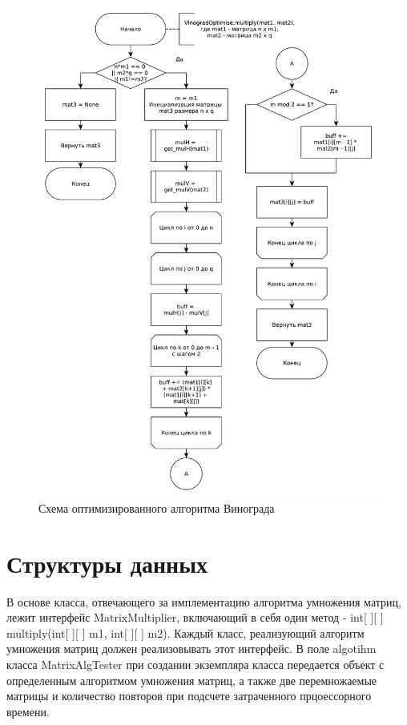 \documentclass[12pt]{report}
\begin{document}
    \begin{figure}[H]
        \centering
        \includegraphics[width=0.85\linewidth]{img/VinogradOptimise}
        \caption{
                Схема оптимизированного алгоритма Винограда
            }
        \label{fig:opt_vinograd}
    \end{figure}

	\section{Структуры данных}
	В основе класса, отвечающего за имплементацию алгоритма умножения матриц,
	лежит интерфейс MatrixMultiplier, включающий в себя один метод - int{[ ][ ]} multiply(int{[ ][ ]} m1, int{[ ][ ]} m2).
	Каждый класс, реализующий алгоритм умножения матриц должен реализовывать этот интерфейс.
	В поле algotihm класса MatrixAlgTester при создании экземпляра класса передается
	объект с определенным алгоритмом умножения матриц, а также две перемножаемые матрицы
	и количество повторов при подсчете затраченного прцоессорного времени.
	
\end{document}
